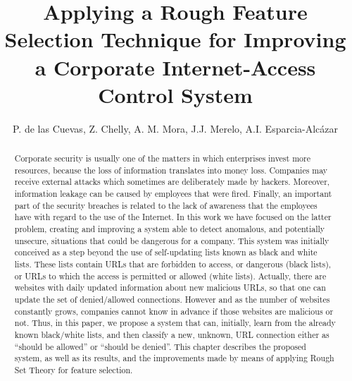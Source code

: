 \documentclass{llncs}
\begin{document}

\title{Applying a Rough Feature Selection Technique for Improving a Corporate Internet-Access Control System}


\author{P. de las Cuevas, Z. Chelly, A. M. Mora, J.J. Merelo, A.I. Esparcia-Alcázar}


\maketitle

%
%
\begin{abstract} 
Corporate security is usually one of the matters in which enterprises invest more resources, because the loss of information translates into money loss. Companies may receive external attacks which sometimes are deliberately made by hackers. Moreover, information leakage can be caused by employees that were fired. Finally, an important part of the security breaches is related to the lack of awareness that the employees have with regard to the use of the Internet. In this work we have focused on the latter problem, creating and improving a system able to detect anomalous, and potentially unsecure, situations that could be dangerous for a company. This system was initially conceived as a step beyond the use of self-updating lists known as black and white lists. These lists contain URLs that are forbidden to access, or dangerous (black lists), or URLs to which the access is permitted or allowed (white lists). Actually, there are websites with daily updated information about new malicious URLs, so that one can update the set of denied/allowed connections. However and as the number of websites constantly grows, companies cannot know in advance if those websites are malicious or not. Thus, in this paper, we propose a system that can, initially, learn from the already known black/white lists, and then classify a new, unknown, URL connection either as ``should be allowed'' or ``should be denied''. This chapter describes the proposed system, as well as its results, and the improvements made by means of applying Rough Set Theory for feature selection.
\end{abstract}
\end{document}
